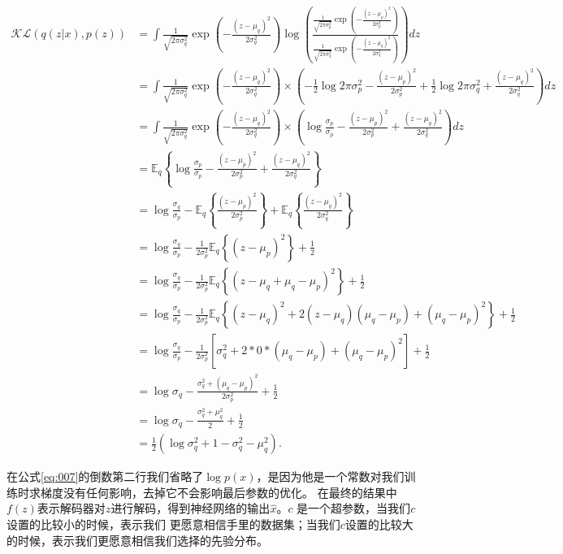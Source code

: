 \documentclass[twocolumn]{article}
\begin{document}
\begin{strip}
\begin{equation}
    \begin{aligned}
        \mathcal{KL}(q(z|x), p(z)) &= \int \frac{1}{\sqrt{2\pi\sigma_q^2}}\exp\left( -\frac{(z-\mu_q)^2}{2\sigma_q^2} \right)   \log\left( \frac{ \frac{1}{\sqrt{2\pi\sigma_p^2}}\exp\left( -\frac{(z-\mu_p)^2}{2\sigma_p^2} \right) }{ \frac{1}{\sqrt{2\pi\sigma_q^2}}\exp\left( -\frac{(z-\mu_q)^2}{2\sigma_q^2} \right) }\right) dz \\
        &= \int \frac{1}{\sqrt{2\pi\sigma_q^2}}\exp\left( -\frac{(z-\mu_q)^2}{2\sigma_q^2} \right)\times \left(-\frac{1}{2}\log2\pi\sigma_p^2 - \frac{(z-\mu_p)^2}{2\sigma_p^2}  + \frac{1}{2}\log2\pi\sigma_q^2 + \frac{(z-\mu_q)^2}{2\sigma_q^2}  \right)dz\\
        &= \int \frac{1}{\sqrt{2\pi\sigma_q^2}}\exp\left( -\frac{(z-\mu_q)^2}{2\sigma_q^2} \right)\times \left(\log\frac{\sigma_p}{\sigma_p} - \frac{(z-\mu_p)^2}{2\sigma_p^2}  +  \frac{(z-\mu_q)^2}{2\sigma_q^2}  \right)dz\\
        &= \mathbb{E}_q\left\{ \log\frac{\sigma_p}{\sigma_p} - \frac{(z-\mu_p)^2}{2\sigma_p^2}  +  \frac{(z-\mu_q)^2}{2\sigma_q^2} \right\} \\
        &= \log\frac{\sigma_q}{\sigma_p} - \mathbb{E}_q\left\{  \frac{(z-\mu_p)^2}{2\sigma_p^2} \right\}  +   \mathbb{E}_q\left\{  \frac{(z-\mu_q)^2}{2\sigma_q^2} \right\} \\
        &= \log\frac{\sigma_q}{\sigma_p} - \frac{1}{2\sigma_p^2} \mathbb{E}_q\left\{ (z-\mu_p)^2 \right\}  +  \frac{1}{2} \\
        &= \log\frac{\sigma_q}{\sigma_p} - \frac{1}{2\sigma_p^2} \mathbb{E}_q\left\{ (z-\mu_q+ \mu_q-\mu_p)^2 \right\}  +  \frac{1}{2} \\
        &= \log\frac{\sigma_q}{\sigma_p} - \frac{1}{2\sigma_p^2} \mathbb{E}_q\left\{ (z-\mu_q)^2 +2(z-\mu_q)(\mu_q-\mu_p) + (\mu_q-\mu_p)^2 \right\}  +  \frac{1}{2} \\
        &= \log\frac{\sigma_q}{\sigma_p} - \frac{1}{2\sigma_p^2} \left[ \sigma_q^2 +2*0*(\mu_q-\mu_p) + (\mu_q-\mu_p)^2 \right]  +  \frac{1}{2} \\
        &= \log\sigma_q - \frac{ \sigma_q^2 + (\mu_q-\mu_p)^2 }{2\sigma_p^2}  +  \frac{1}{2} \\
        &= \log\sigma_q - \frac{ \sigma_q^2 + \mu_q^2 }{2}  +  \frac{1}{2} \\
        &= \frac{1}{2}\left( \log\sigma_q^2  +  1 - \sigma_q^2 - \mu_q^2  \right).
    \end{aligned}
    \label{eq:008}
\end{equation}
\end{strip}
    在公式\eqref{eq:007}的倒数第二行我们省略了$ \log p(x) $，是因为他是一个常数对我们训练时求梯度没有任何影响，去掉它不会影响最后参数的优化。
    在最终的结果中$ f(z) $表示解码器对$ z $进行解码，得到神经网络的输出$ \hat{x} $。$c$ 是一个超参数，当我们$ c $设置的比较小的时候，表示我们
    更愿意相信手里的数据集；当我们$ c $设置的比较大的时候，表示我们更愿意相信我们选择的先验分布。
    
\end{document}
